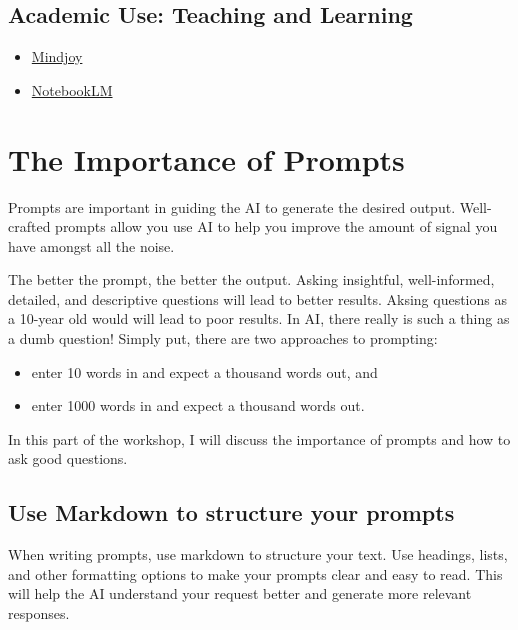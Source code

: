 \documentclass[
  10t,
]{article}
\providecommand{\tightlist}{%
  \setlength{\itemsep}{0pt}\setlength{\parskip}{0pt}}
\begin{document}
\subsection{Academic Use: Teaching and
Learning}\label{academic-use-teaching-and-learning}

\begin{itemize}
\tightlist
\item
  \href{https://www.mindjoy.com}{Mindjoy}
\item
  \href{https://notebooklm.google/}{NotebookLM}
\end{itemize}

\section{The Importance of Prompts}\label{the-importance-of-prompts}

Prompts are important in guiding the AI to generate the desired output.
Well-crafted prompts allow you use AI to help you improve the amount of
signal you have amongst all the noise.

The better the prompt, the better the output. Asking insightful,
well-informed, detailed, and descriptive questions will lead to better
results. Aksing questions as a 10-year old would will lead to poor
results. In AI, there really is such a thing as a dumb question! Simply
put, there are two approaches to prompting:

\begin{itemize}
\tightlist
\item
  enter 10 words in and expect a thousand words out, and
\item
  enter 1000 words in and expect a thousand words out.
\end{itemize}

In this part of the workshop, I will discuss the importance of prompts
and how to ask good questions.

\subsection{Use Markdown to structure your
prompts}\label{use-markdown-to-structure-your-prompts}

When writing prompts, use markdown to structure your text. Use headings,
lists, and other formatting options to make your prompts clear and easy
to read. This will help the AI understand your request better and
generate more relevant responses.
\end{document}
